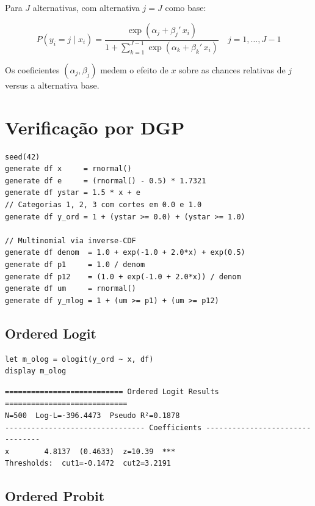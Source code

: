 Para $J$ alternativas, com alternativa $j=J$ como base:

\[
  P(y_i = j \mid x_i) = \frac{\exp(\alpha_j + \beta_j'\,x_i)}{1 + \sum_{k=1}^{J-1} \exp(\alpha_k + \beta_k'\,x_i)}
  \quad j = 1,\ldots,J-1
\]

Os coeficientes $(\alpha_j, \beta_j)$ medem o efeito de $x$ sobre as chances
relativas de $j$ versus a alternativa base.

\section{Verificação por DGP}

\begin{lstlisting}[caption={DGP para modelos ordenados e multinomial}]
seed(42)
generate df x     = rnormal()
generate df e     = (rnormal() - 0.5) * 1.7321
generate df ystar = 1.5 * x + e
// Categorias 1, 2, 3 com cortes em 0.0 e 1.0
generate df y_ord = 1 + (ystar >= 0.0) + (ystar >= 1.0)

// Multinomial via inverse-CDF
generate df denom  = 1.0 + exp(-1.0 + 2.0*x) + exp(0.5)
generate df p1     = 1.0 / denom
generate df p12    = (1.0 + exp(-1.0 + 2.0*x)) / denom
generate df um     = rnormal()
generate df y_mlog = 1 + (um >= p1) + (um >= p12)
\end{lstlisting}

\subsection*{Ordered Logit}

\begin{lstlisting}
let m_olog = ologit(y_ord ~ x, df)
display m_olog
\end{lstlisting}

\begin{lstlisting}[language={}, basicstyle=\ttfamily\small,
  frame=none, numbers=none, backgroundcolor=\color{codbg},
  xleftmargin=0pt, xrightmargin=0pt, breaklines=false]
=========================== Ordered Logit Results ============================
N=500  Log-L=-396.4473  Pseudo R²=0.1878
-------------------------------- Coefficients --------------------------------
x        4.8137  (0.4633)  z=10.39  ***
Thresholds:  cut1=-0.1472  cut2=3.2191
\end{lstlisting}

\subsection*{Ordered Probit}

